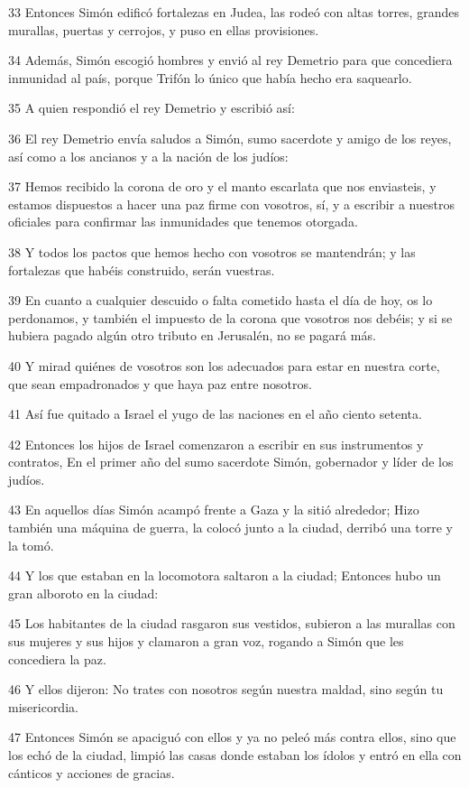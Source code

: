 \par 33 Entonces Simón edificó fortalezas en Judea, las rodeó con altas torres, grandes murallas, puertas y cerrojos, y puso en ellas provisiones.
\par 34 Además, Simón escogió hombres y envió al rey Demetrio para que concediera inmunidad al país, porque Trifón lo único que había hecho era saquearlo.
\par 35 A quien respondió el rey Demetrio y escribió así:
\par 36 El rey Demetrio envía saludos a Simón, sumo sacerdote y amigo de los reyes, así como a los ancianos y a la nación de los judíos:
\par 37 Hemos recibido la corona de oro y el manto escarlata que nos enviasteis, y estamos dispuestos a hacer una paz firme con vosotros, sí, y a escribir a nuestros oficiales para confirmar las inmunidades que tenemos otorgada.
\par 38 Y todos los pactos que hemos hecho con vosotros se mantendrán; y las fortalezas que habéis construido, serán vuestras.
\par 39 En cuanto a cualquier descuido o falta cometido hasta el día de hoy, os lo perdonamos, y también el impuesto de la corona que vosotros nos debéis; y si se hubiera pagado algún otro tributo en Jerusalén, no se pagará más.
\par 40 Y mirad quiénes de vosotros son los adecuados para estar en nuestra corte, que sean empadronados y que haya paz entre nosotros.
\par 41 Así fue quitado a Israel el yugo de las naciones en el año ciento setenta.
\par 42 Entonces los hijos de Israel comenzaron a escribir en sus instrumentos y contratos, En el primer año del sumo sacerdote Simón, gobernador y líder de los judíos.
\par 43 En aquellos días Simón acampó frente a Gaza y la sitió alrededor; Hizo también una máquina de guerra, la colocó junto a la ciudad, derribó una torre y la tomó.
\par 44 Y los que estaban en la locomotora saltaron a la ciudad; Entonces hubo un gran alboroto en la ciudad:
\par 45 Los habitantes de la ciudad rasgaron sus vestidos, subieron a las murallas con sus mujeres y sus hijos y clamaron a gran voz, rogando a Simón que les concediera la paz.
\par 46 Y ellos dijeron: No trates con nosotros según nuestra maldad, sino según tu misericordia.
\par 47 Entonces Simón se apaciguó con ellos y ya no peleó más contra ellos, sino que los echó de la ciudad, limpió las casas donde estaban los ídolos y entró en ella con cánticos y acciones de gracias.
